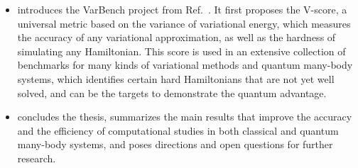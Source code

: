 \begin{itemize}
\item {} introduces the VarBench project from Ref.~\cite{wu2024variational}. It first proposes the V-score, a universal metric based on the variance of variational energy, which measures the accuracy of any variational approximation, as well as the hardness of simulating any Hamiltonian. This score is used in an extensive collection of benchmarks for many kinds of variational methods and quantum many-body systems, which identifies certain hard Hamiltonians that are not yet well solved, and can be the targets to demonstrate the quantum advantage.
\item {} concludes the thesis, summarizes the main results that improve the accuracy and the efficiency of computational studies in both classical and quantum many-body systems, and poses directions and open questions for further research.
\end{itemize}

